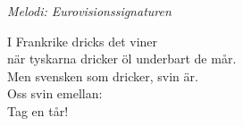 {\footnotesize\textit{Melodi: Eurovisionssignaturen}}\par
\vspace{10pt}
I Frankrike dricks det viner\\
när tyskarna dricker öl underbart de mår.\\
Men svensken som dricker, svin är.\\
Oss svin emellan:\\
Tag en tår!
